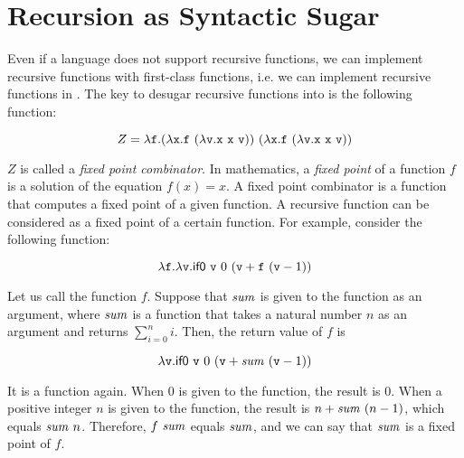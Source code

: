 \section{Recursion as Syntactic Sugar}

Even if a language does not support recursive functions, we can implement
recursive functions with first-class functions, i.e. we can implement recursive
functions in \plang. The key to desugar recursive functions into \plang is the
following function:

\[
  Z=\efun{\cf}{\eapp
    {(\efun{\cx}{\eapp{\cf}{(\efun{\cv}{\eapp{\eapp{\cx}{\cx}}{\cv}})}})}
    {(\efun{\cx}{\eapp{\cf}{(\efun{\cv}{\eapp{\eapp{\cx}{\cx}}{\cv}})}})}
  }
\]

$Z$ is called a \textit{fixed point combinator}.
In mathematics, a \textit{fixed point}
of a function $f$ is a solution of the equation $f(x)=x$.
A fixed point combinator is a function that computes a fixed point of a given
function. A recursive function can be considered as a fixed point of a certain
function. For example, consider the following function:

\[ \lambda\texttt{f}.\lambda\texttt{v}.\textsf{if0}\ \texttt{v}\ 0\ (\texttt{v}+\texttt{f}\ (\texttt{v}-1)) \]

Let us call the function $f$.
Suppose that $\mbox{\emph{sum}}$ is given to the function as an argument, where
$\mbox{\emph{sum}}$ is a function that takes a natural number $n$ as an argument
and returns $\sum_{i=0}^n i$. Then, the return value of $f$ is

\[
  \lambda\texttt{v}.\textsf{if0}\ \texttt{v}\ 0\ (\texttt{v}+\mbox{\emph{sum}}\ (\texttt{v}-1))
\]

It is a function again. When $0$ is given to the function, the result is $0$.
When a positive integer $n$ is given to the function, the result is
$n+\mbox{\emph{sum}}\ (n-1)$, which equals $\mbox{\emph{sum}}\ n$.
Therefore, $f\ \mbox{\emph{sum}}$ equals $\mbox{\emph{sum}}$, and we can say that
$\mbox{\emph{sum}}$ is a fixed point of $f$.

